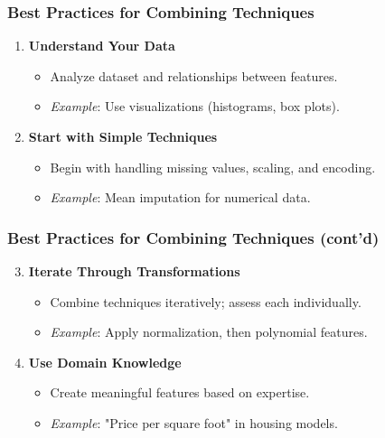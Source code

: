 \documentclass[aspectratio=169]{beamer}
\begin{document}
\begin{frame}
  \frametitle{Best Practices for Combining Techniques}
  \begin{enumerate}
    \item \textbf{Understand Your Data}
      \begin{itemize}
        \item Analyze dataset and relationships between features.
        \item \textit{Example}: Use visualizations (histograms, box plots).
      \end{itemize}
    \item \textbf{Start with Simple Techniques}
      \begin{itemize}
        \item Begin with handling missing values, scaling, and encoding.
        \item \textit{Example}: Mean imputation for numerical data.
      \end{itemize}
  \end{enumerate}
\end{frame}

\begin{frame}
  \frametitle{Best Practices for Combining Techniques (cont'd)}
  \begin{enumerate}
    \setcounter{enumi}{2}
    \item \textbf{Iterate Through Transformations}
      \begin{itemize}
        \item Combine techniques iteratively; assess each individually.
        \item \textit{Example}: Apply normalization, then polynomial features.
      \end{itemize}
    \item \textbf{Use Domain Knowledge}
      \begin{itemize}
        \item Create meaningful features based on expertise.
        \item \textit{Example}: "Price per square foot" in housing models.
      \end{itemize}
  \end{enumerate}
\end{frame}
\end{document}

